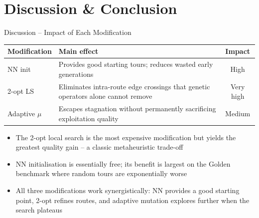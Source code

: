 \documentclass[aspectratio=169]{beamer}
\begin{document}
\section{Discussion \& Conclusion}

\begin{frame}{Discussion -- Impact of Each Modification}
  \begin{center}
  \begin{tabular}{lp{6.5cm}c}
    \toprule
    Modification & Main effect & Impact \\
    \midrule
    NN init       & Provides good starting tours; reduces wasted
                    early generations                              & High \\[4pt]
    2-opt LS      & Eliminates intra-route edge crossings that
                    genetic operators alone cannot remove          & Very high \\[4pt]
    Adaptive $\mu$ & Escapes stagnation without permanently
                    sacrificing exploitation quality               & Medium \\
    \bottomrule
  \end{tabular}
  \end{center}

  \vspace{6pt}
  \begin{itemize}
    \item The 2-opt local search is the most expensive modification but
          yields the greatest quality gain -- a classic metaheuristic trade-off
    \item NN initialisation is essentially free; its benefit is largest on
          the Golden benchmark where random tours are exponentially worse
    \item All three modifications work synergistically: NN provides a
          good starting point, 2-opt refines routes, and adaptive mutation
          explores further when the search plateaus
  \end{itemize}
\end{frame}
\end{document}
